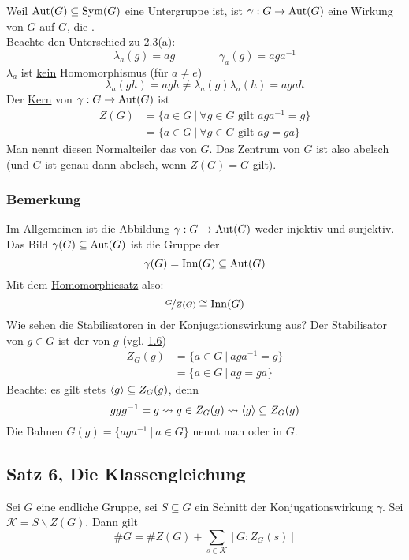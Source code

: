 Weil $\operatorname{Aut}(G)\subseteq \operatorname{Sym}(G)$ eine Untergruppe ist, ist $\gamma:G\to \operatorname{Aut}(G)$ eine Wirkung von $G$ auf $G$, die .\\
Beachte den Unterschied zu \hyperref[sub:bsp_wirkungen]{2.3(a)}:
\[
\lambda_a(g)=ag\qquad\qquad \gamma_a(g)=aga^{-1}
\]
$\lambda_a$ ist \uline{kein} Homomorphismus (für $a\not=e $) 
\[\lambda_a(gh)=agh\not= \lambda_a(g)\lambda_a(h)=agah 
\]
Der \uline{Kern} von $\gamma:G\to\operatorname{Aut}(G)$ ist
\begin{equation*}
\begin{aligned}
	Z(G) &= \{a\in G~|~\forall g\in G\text{ gilt }aga^{-1}=g\}\\
	&= \{a\in G~|~\forall g\in G\text{ gilt }ag=ga \}
\end{aligned}
\end{equation*}
Man nennt diesen Normalteiler das  von $G$. 
Das Zentrum von $G$ ist also abelsch (und $G$ ist genau dann abelsch, wenn $Z(G)=G$ gilt).


\subsubsection*{Bemerkung}
Im Allgemeinen ist die Abbildung $\gamma:G\to\operatorname{Aut}(G)$ weder injektiv und surjektiv. 
Das Bild $\gamma(G)\subseteq\operatorname{Aut}(G)$ ist die Gruppe der  
\[
\gamma(G)=\operatorname{Inn}(G)\subseteq \operatorname{Aut}(G)
\]
Mit dem \hyperref[sud:der_homomorphiesatz]{Homomorphiesatz} also: 
\[
\nicefrac{G}{Z(G)}\cong\operatorname{Inn}(G)
\]
Wie sehen die Stabilisatoren in der Konjugationswirkung aus? 
Der Stabilisator von $g\in G$ ist der  von $g$ (vgl. \hyperref[sub:def_zentralisieren]{1.6})
\begin{equation*}
\begin{aligned}
	Z_G(g) &= \{a\in G~|~aga^{-1}=g \}\\
	&= \{a\in G~|~ag=ga \}
\end{aligned}
\end{equation*}
Beachte: 
es gilt stets $\langle g \rangle\subseteq Z_G(g)$, denn 
\[
ggg^{-1}=g \rightsquigarrow g\in Z_G(g) \rightsquigarrow \langle g \rangle\subseteq Z_G(g) 
\]
Die Bahnen $G(g)=\{aga^{-1}~|~a\in G\}$ nennt man  oder  in $G$.


\subsection{Satz 6, Die Klassengleichung}
\label{sub:klassengleichung}
Sei $G$ eine endliche Gruppe, sei $S\subseteq G$ ein Schnitt der Konjugationswirkung $\gamma$.
Sei $\mathcal{K}=S\backslash Z(G)$. 
Dann gilt 
\[
\#G=\#Z(G)+\sum_{s\in \mathcal{K}}[G:Z_G(s)] 
\]

